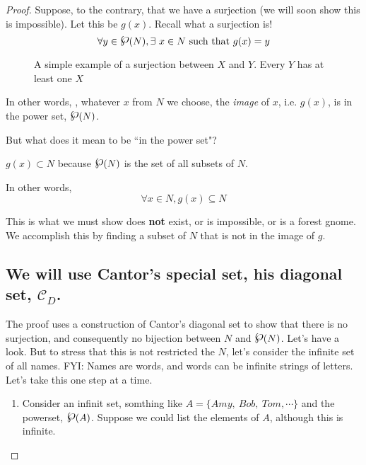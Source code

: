 \begin{proof}
Suppose, to the contrary, that we have a surjection (we will soon show this is impossible).  Let this be $g(x)$.  Recall what a surjection is!
$$ \forall y\in \powerset (N), \exists~ x\in N \textrm{ such that } g(x) = y$$
\begin{figure}[h]
\centering
{}
\caption{A simple example of a surjection between $X$ and $Y$.  Every $Y$ has at least one $X$}
\end{figure}
In other words, , whatever $x$ from $N$ we choose, the \emph{image} of $x$, i.e. $g(x)$, is in the power set, $\powerset (N)$.

But what does it mean to be ``in the power set"?

\ifKey
\hfill\begin{minipage}{0.5\textwidth}\color{red} $g(x)\subset N$ because $\powerset (N)$ is the set of all subsets of $N$.
\color{black}\end{minipage}
\fi

In other words,
$$\forall x \in N, g(x)\subseteq N $$ 

This is what we must show does \textbf{not} exist, or is impossible, or is a forest gnome.  We accomplish this by finding a subset of $N$ that is not in the image of $g$.  

\subsection*{We will use Cantor's special set, his diagonal set, $\mathcal{C}_D$.}
The proof uses a construction of Cantor's diagonal set to show that there is no surjection, and consequently no bijection between $N$ and $\powerset(N)$.  Let's have a look.  But to stress that this is not restricted the $N$, let's consider the infinite set of all names.  FYI: Names are words, and words can be infinite strings of letters.  Let's take this one step at a time.
\begin{enumerate}
\item Consider an infinit set, somthing like $A  =\{Amy, ~Bob, ~Tom, \cdots \}$ and the powerset, $\powerset(A)$.  Suppose we could list the elements of $A$, although this is infinite.


\end{enumerate}
\end{proof}
